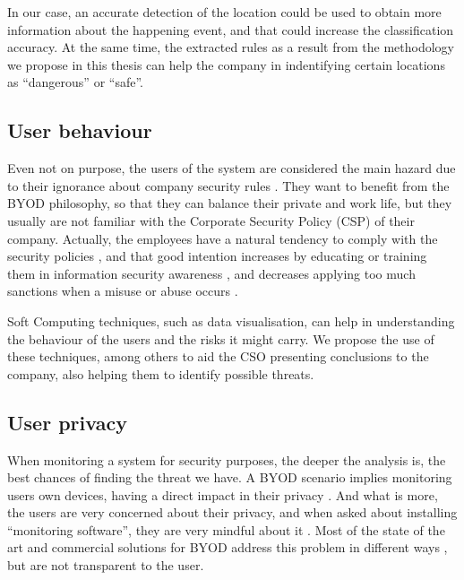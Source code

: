 In our case, an accurate detection of the location could be used to obtain more information about the happening event, and that could increase the classification accuracy. At the same time, the extracted rules as a result from the methodology we propose in this thesis can help the company in indentifying certain locations as ``dangerous'' or ``safe''.

\subsection{User behaviour}
\label{subsec:behav}

Even not on purpose, the users of the system are considered the main hazard due to their ignorance about company security rules  \cite{Adams_users99}. They want to benefit from the BYOD philosophy, so that they can balance their private and work life, but they usually are not familiar with the Corporate Security Policy (CSP) of their company.  Actually, the employees have a natural tendency to comply with the security policies \cite{Sip_SecPriv07,Bulg_SecPol10,AlOmari_SecPol12}, and that good intention increases by educating or training them in information security awareness  \cite{Shaw_SecAware09}, and decreases applying too much sanctions when a misuse or abuse occurs \cite{Her_SecPol09}.

Soft Computing techniques, such as data visualisation, can help in understanding the behaviour of the users and the risks it might carry. We propose the use of these techniques, among others to aid the CSO presenting conclusions to the company, also helping them to identify possible threats.

\subsection{User privacy}
\label{subsec:user_priv}

When monitoring a system for security purposes, the deeper the analysis is, the best chances of finding the threat we have. A BYOD scenario implies monitoring users own devices, having a direct impact in their privacy \cite{Miller12Privacy}. And what is more, the users are very concerned about their privacy, and when asked about installing ``monitoring software'', they are very mindful about it \cite{Miller12Privacy, ali2015analysis}. Most of the state of the art and commercial solutions for BYOD address this problem in different ways \cite{de2015corporate}, but are not transparent to the user.


